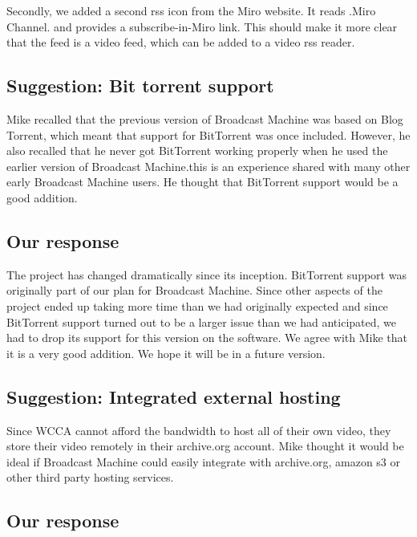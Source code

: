 \documentclass[a4paper,12pt]{report}
\begin{document}
Secondly, we added a second rss icon from the Miro website. 
It reads .Miro Channel. and provides a subscribe-in-Miro link. 
This should make it more clear that the feed is a video feed, which can be added to a video rss reader. 

\subsection{Suggestion: Bit torrent support}

Mike recalled that the previous version of Broadcast Machine was based on Blog Torrent, which meant that support for 
BitTorrent was once included. 
However, he also recalled that he never got BitTorrent working properly when he used the earlier version of Broadcast 
Machine.this is an experience shared with many other early Broadcast Machine users. 
He thought that BitTorrent support would be a good addition.

\subsection{Our response}

The project has changed dramatically since its inception. 
BitTorrent support was originally part of our plan for Broadcast Machine. 
Since other aspects of the project ended up taking more time than we had originally expected and since BitTorrent 
support turned out to be a larger issue than we had anticipated, we had to drop its support for this version on the 
software. 
We agree with Mike that it is a very good addition. 
We hope it will be in a future version.

\subsection{Suggestion: Integrated external hosting}

Since WCCA cannot afford the bandwidth to host all of their own video, they store their video remotely in their 
archive.org account. 
Mike thought it would be ideal if Broadcast Machine could easily integrate with archive.org, amazon s3 or other third 
party hosting services. 

\subsection{Our response}
\end{document}

